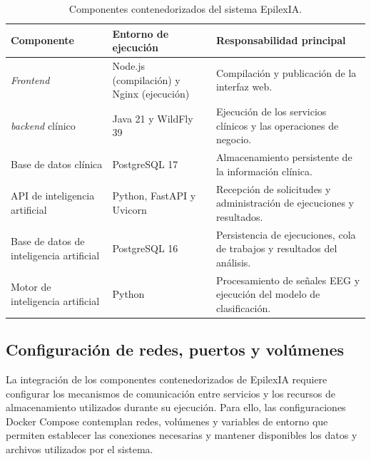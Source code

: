 \begin{table}[htbp]
    \centering
    \caption{Componentes contenedorizados del sistema EpilexIA.}
    \label{tab:componentes-contenedorizados}
    \small
    \begin{tabularx}{\textwidth}{|
        >{\raggedright\arraybackslash}p{}|
        >{\raggedright\arraybackslash}p{}|
        >{\raggedright\arraybackslash}X|}
        \hline
        \textbf{Componente} &
        \textbf{Entorno de ejecución} &
        \textbf{Responsabilidad principal} \\
        \hline

        \textit{Frontend} &
        Node.js (compilación) y Nginx (ejecución) &
        Compilación y publicación de la interfaz web. \\
        \hline

        \textit{backend} clínico &
        Java 21 y WildFly 39 &
        Ejecución de los servicios clínicos y las operaciones de negocio. \\
        \hline

        Base de datos clínica &
        PostgreSQL 17 &
        Almacenamiento persistente de la información clínica. \\
        \hline

        API de inteligencia artificial &
        Python, FastAPI y Uvicorn &
        Recepción de solicitudes y administración de ejecuciones y resultados. \\
        \hline

        Base de datos de inteligencia artificial &
        PostgreSQL 16 &
        Persistencia de ejecuciones, cola de trabajos y resultados del análisis. \\
        \hline

        Motor de inteligencia artificial &
        Python &
        Procesamiento de señales EEG y ejecución del modelo de clasificación. \\
        \hline
    \end{tabularx}
\end{table}


\subsection{Configuración de redes, puertos y volúmenes}

La integración de los componentes contenedorizados de EpilexIA
requiere configurar los mecanismos de comunicación entre
servicios y los recursos de almacenamiento utilizados durante
su ejecución. Para ello, las configuraciones Docker Compose
contemplan redes, volúmenes y variables de entorno que permiten
establecer las conexiones necesarias y mantener disponibles
los datos y archivos utilizados por el sistema.

